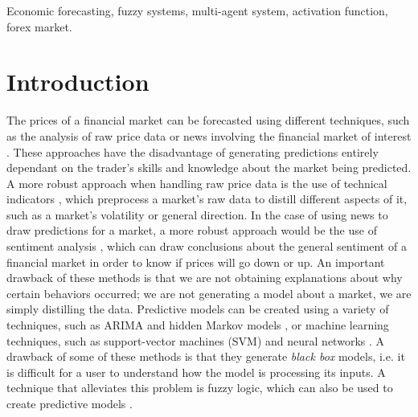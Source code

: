 ﻿\documentclass{ieeeaccess}
\begin{document}
\begin{keywords}
  Economic forecasting, fuzzy systems, multi-agent system, activation function, forex market.
\end{keywords}

\titlepgskip=-15pt

\maketitle

\section{Introduction} %
\label{section:introduction}

The prices of a financial market can be forecasted using different
techniques, such as the analysis of raw price data or news involving
the financial market of interest \cite{Liu2019}. These approaches have
the disadvantage of generating predictions
entirely dependant on the trader's skills and knowledge about the
market being predicted. 
A more robust approach when handling raw price
data is the use of technical indicators \cite{Alsubaie2019}, which
preprocess a market's raw data to distill different aspects of it,
such as a market's volatility or general direction. In the case of
using news to draw predictions for a market, a more robust approach
would be the use of sentiment analysis \cite{LienMinh2018}
\cite{Cabrera2018}, which can draw conclusions about the general
sentiment of a financial market in order to know if prices will go
down or up. An important drawback of these methods is that we 
are not obtaining explanations about why certain behaviors occurred; we
are not generating a model about a market, we are simply distilling
the data. Predictive models can be created using a variety of
techniques, such as ARIMA \cite{Idrees2019} and hidden Markov models
\cite{Cao2019}, or machine learning techniques, such as support-vector
machines (SVM) \cite{Guo2018} and neural networks \cite{Chen2019a}. A
drawback of some of these methods is that they generate \textit{black
box} models, i.e. it is difficult for a user to understand how the
model is processing its inputs. A technique that alleviates this
problem is fuzzy logic, which can also be used to create predictive
models \cite{Jiang2018} \cite{Sang2019} \cite{Chourmouziadis2019}.
\end{document}

